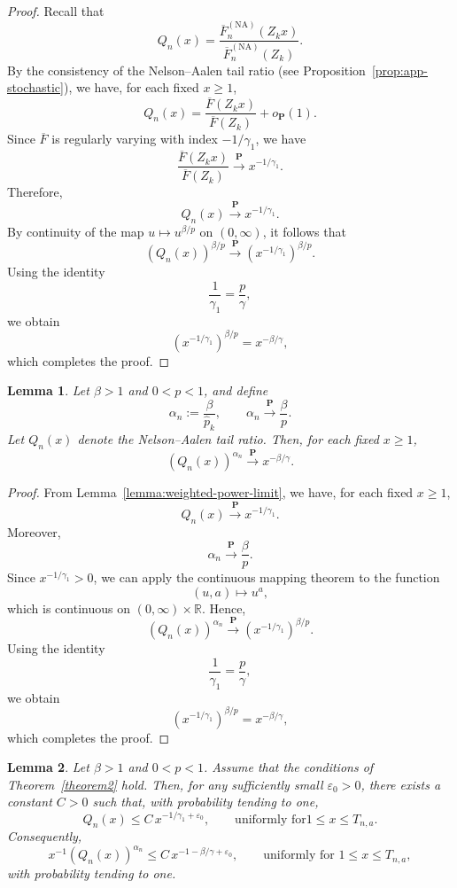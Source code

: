 \documentclass[reqno,openbib,runningheads,a4paper,12pt]{amsart}%
\newtheorem{lemma}{Lemma}[section]
\begin{document}
\begin{proof}
Recall that
\[
Q_{n}(x) = \frac{\overline{F}_{n}^{(\mathrm{NA})}(Z_{k}x)} {\overline{F}%
_{n}^{(\mathrm{NA})}(Z_{k})}.
\]
By the consistency of the Nelson--Aalen tail ratio (see
Proposition~\ref{prop:app-stochastic}), we have, for each fixed $x\geq1$,
\[
Q_{n}(x) = \frac{\overline{F}(Z_{k}x)}{\overline{F}(Z_{k})} + o_{\mathbf{P}%
}(1).
\]
Since $\overline{F}$ is regularly varying with index $-1/\gamma_{1}$, we have
\[
\frac{\overline{F}(Z_{k}x)}{\overline{F}(Z_{k})} \overset{\mathbf{P}%
}{\longrightarrow} x^{-1/\gamma_{1}}.
\]
Therefore,
\[
Q_{n}(x) \overset{\mathbf{P}}{\longrightarrow} x^{-1/\gamma_{1}}.
\]
By continuity of the map $u\mapsto u^{\beta/p}$ on $(0,\infty)$, it follows
that
\[
\left(  Q_{n}(x)\right)  ^{\beta/p} \overset{\mathbf{P}}{\longrightarrow}
\left(  x^{-1/\gamma_{1}}\right)  ^{\beta/p}.
\]
Using the identity
\[
\frac{1}{\gamma_{1}}=\frac{p}{\gamma},
\]
we obtain
\[
\left(  x^{-1/\gamma_{1}}\right)  ^{\beta/p} = x^{-\beta/\gamma},
\]
which completes the proof.
\end{proof}

\begin{lemma}
\label{lemma:power-convergence-alpha} Let $\beta>1$ and $0<p<1$, and define
\[
\alpha_{n}:=\frac{\beta}{\widehat{p}_{k}}, \qquad\alpha_{n}\overset{\mathbf{P}%
}{\longrightarrow}\frac{\beta}{p}.
\]
Let $Q_{n}(x)$ denote the Nelson--Aalen tail ratio. Then, for each fixed
$x\geq1$,
\[
\left(  Q_{n}(x)\right)  ^{\alpha_{n}} \overset{\mathbf{P}}{\longrightarrow}
x^{-\beta/\gamma}.
\]

\end{lemma}

\begin{proof}
From Lemma~\ref{lemma:weighted-power-limit}, we have, for each fixed $x\geq
1$,
\[
Q_{n}(x)\overset{\mathbf{P}}{\longrightarrow} x^{-1/\gamma_{1}}.
\]
Moreover,
\[
\alpha_{n} \overset{\mathbf{P}}{\longrightarrow} \frac{\beta}{p}.
\]
Since $x^{-1/\gamma_{1}}>0$, we can apply the continuous mapping theorem to
the function
\[
(u,a)\mapsto u^{a},
\]
which is continuous on $(0,\infty)\times\mathbb{R}$. Hence,
\[
\left(  Q_{n}(x)\right)  ^{\alpha_{n}} \overset{\mathbf{P}}{\longrightarrow}
\left(  x^{-1/\gamma_{1}}\right)  ^{\beta/p}.
\]
Using the identity
\[
\frac{1}{\gamma_{1}}=\frac{p}{\gamma},
\]
we obtain
\[
\left(  x^{-1/\gamma_{1}}\right)  ^{\beta/p} = x^{-\beta/\gamma},
\]
which completes the proof.
\end{proof}

\begin{lemma}
\label{lem:domination-Qn} Let $\beta>1$ and $0<p<1$. Assume that the
conditions of Theorem~\ref{theorem2} hold. Then, for any sufficiently small
$\varepsilon_{0}>0$, there exists a constant $C>0$ such that, with probability
tending to one,
\[
Q_{n}(x) \leq C\,x^{-1/\gamma_{1}+\varepsilon_{0}}, \qquad\text{uniformly for
}1\leq x\leq T_{n,a}.
\]
Consequently,
\[
x^{-1}\left(  Q_{n}(x)\right)  ^{\alpha_{n}} \leq C\,x^{-1-\beta
/\gamma+\varepsilon_{0}}, \qquad\text{uniformly for }1\leq x\leq T_{n,a},
\]
with probability tending to one.
\end{lemma}
\end{document}
